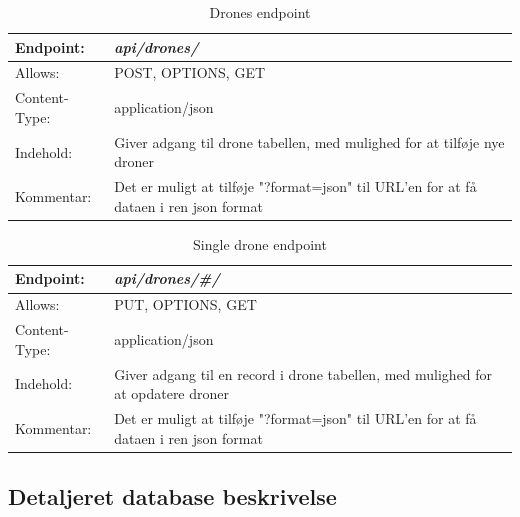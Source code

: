 \begin{table}[H]
\begin{tabular}{| p{3cm}| p{11.5cm}|}
\hline
Endpoint:	 							&\textbf{\textit{api/drones/}}\\\hline
Allows:									& POST, OPTIONS, GET\\\hline
Content-Type:						& application/json\\\hline 
Indehold:								& Giver adgang til drone tabellen, med mulighed for at tilføje nye droner\\\hline 
Kommentar:							& Det er muligt at tilføje "?format=json" til URL'en for at få dataen i ren json format\\\hline
\end{tabular}
\caption{Drones endpoint}
\label{drones_endpoint}
\end{table}

\begin{table}[H]
\begin{tabular}{| p{3cm}| p{11.5cm}|}
\hline
Endpoint:	 							&\textbf{\textit{api/drones/\#/}}\\\hline
Allows:									& PUT, OPTIONS, GET\\\hline
Content-Type:						& application/json\\\hline 
Indehold:								& Giver adgang til en record i drone tabellen, med mulighed for at opdatere droner\\\hline 
Kommentar:							& Det er muligt at tilføje "?format=json" til URL'en for at få dataen i ren json format\\\hline
\end{tabular}
\caption{Single drone endpoint}
\label{single_drone_endpoint}
\end{table}

\newpage
\subsection{Detaljeret database beskrivelse}


\newpage

\newpage

\newpage

\newpage



